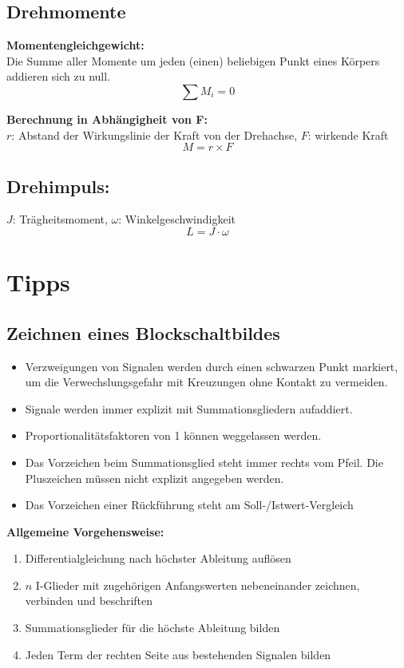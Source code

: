 \documentclass[10pt,a4paper]{article}
\begin{document}
\subsection{Drehmomente}
\textbf{Momentengleichgewicht:} \\
Die Summe aller Momente um jeden (einen) beliebigen Punkt eines Körpers addieren sich zu null.
$$
	\sum M_i = 0
$$

\textbf{Berechnung in Abhängigheit von F:} \\
$r$: Abstand der Wirkungslinie der Kraft von der Drehachse, $F$: wirkende Kraft
$$
	M = r \times F
$$

\subsection{Drehimpuls:}
$J$: Trägheitsmoment, $\omega$: Winkelgeschwindigkeit
$$
	L = J ⋅ \omega
$$



\section{Tipps}
\subsection{Zeichnen eines Blockschaltbildes}
\begin{itemize}
	\item Verzweigungen von Signalen werden durch einen schwarzen Punkt markiert, um die Verwechslungsgefahr mit Kreuzungen ohne Kontakt zu vermeiden.
	\item Signale werden immer explizit mit Summationsgliedern aufaddiert.
	\item Proportionalitätsfaktoren von 1 können weggelassen werden.
	\item Das Vorzeichen beim Summationsglied steht immer rechts vom Pfeil. Die Pluszeichen müssen nicht explizit angegeben werden.
	\item Das Vorzeichen einer Rückführung steht am Soll-/Istwert-Vergleich
\end{itemize}
\textbf{Allgemeine Vorgehensweise:}
\begin{enumerate}
	\item Differentialgleichung nach höchster Ableitung auflösen
	\item $n$ I-Glieder mit zugehörigen Anfangswerten nebeneinander zeichnen, verbinden und beschriften
	\item Summationsglieder für die höchste Ableitung bilden
	\item Jeden Term der rechten Seite aus bestehenden Signalen bilden
\end{enumerate}
\end{document}
